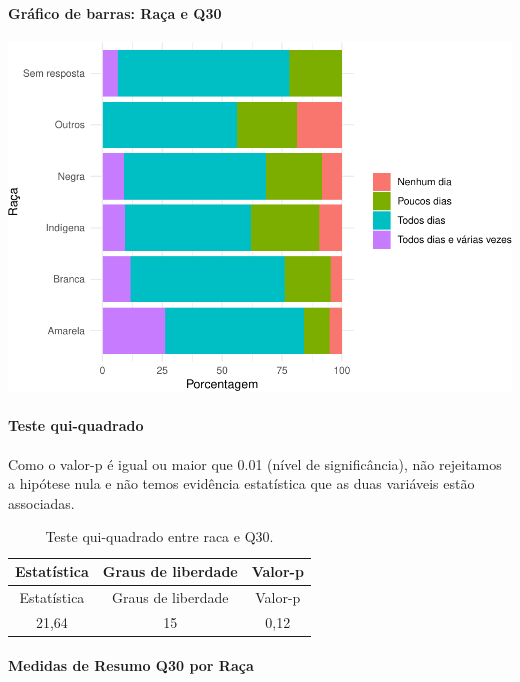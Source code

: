 \documentclass[]{article}
\let\oldparagraph\paragraph
\renewcommand{\paragraph}[1]{\oldparagraph{#1}\mbox{}}
\begin{document}
\hypertarget{gruxe1fico-de-barras-rauxe7a-e-q30}{%
\paragraph{Gráfico de barras: Raça e Q30}\label{gruxe1fico-de-barras-rauxe7a-e-q30}}

\begin{center}\includegraphics[width=0.75\linewidth]{relatorio_covid19_files/figure-latex/unnamed-chunk-988-1} \end{center}

\hypertarget{teste-qui-quadrado-85}{%
\paragraph{Teste qui-quadrado}\label{teste-qui-quadrado-85}}

Como o valor-p é igual ou maior que 0.01 (nível de significância), não rejeitamos a hipótese nula e não temos evidência estatística que as duas variáveis estão associadas.

\begin{longtable}[]{@{}ccc@{}}
\caption{\label{tab:unnamed-chunk-990}Teste qui-quadrado entre raca e Q30.}\tabularnewline
\toprule
Estatística & Graus de liberdade & Valor-p\tabularnewline
\midrule
\endfirsthead
\toprule
Estatística & Graus de liberdade & Valor-p\tabularnewline
\midrule
\endhead
21,64 & 15 & 0,12\tabularnewline
\bottomrule
\end{longtable}

\cleardoublepage

\hypertarget{medidas-de-resumo-q30-por-rauxe7a}{%
\paragraph{Medidas de Resumo Q30 por Raça}\label{medidas-de-resumo-q30-por-rauxe7a}}
\end{document}
